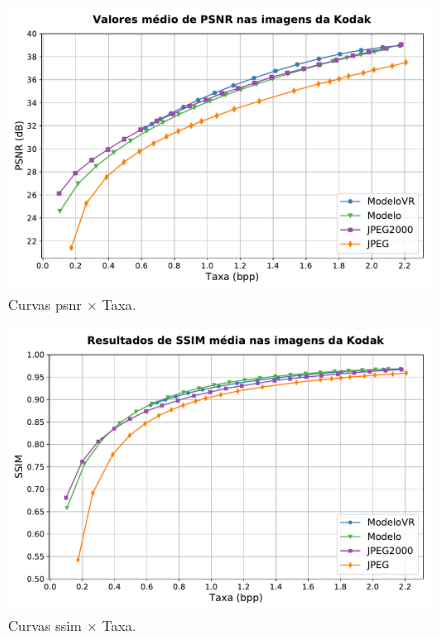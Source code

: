 \begin{figure}[h]
	\centering
	\includegraphics[width=1.0\textwidth]{figuras/comp_codecs.pdf}
	\caption[Comparações de autocodificadores com o JPEG e JPEG2000 em \acrshort{psnr}.]{Curvas \acrshort{psnr} $\times$ Taxa.}  	
	\label{fig:comp_psnr}
\end{figure}

\begin{figure}[h]
	\centering
	\includegraphics[width=1.0\textwidth]{figuras/comp_codecs_ssim.pdf}
	\caption[Comparações de autocodificadores com o JPEG e JPEG2000 em \acrshort{ssim}]{Curvas \acrshort{ssim} $\times$ Taxa.}  	
	\label{fig:comp_ssim}
\end{figure}


